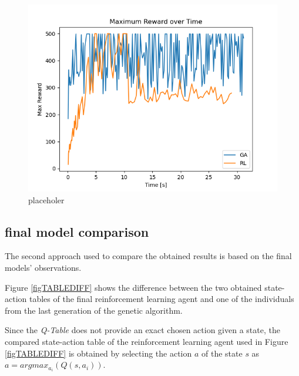 \begin{figure}[H]
	\centering
	\includegraphics [scale = 0.5]{Images/RL_GA_comparison_max.png}
	\caption{placeholer}
	\label{figMAX}
\end{figure}



\subsection{final model comparison}

The second approach used to compare the obtained results is based on the final models' observations.

Figure \ref{figTABLEDIFF} shows the difference between the two obtained state-action tables of the final reinforcement learning agent and one of the individuals from the last generation of the genetic algorithm.

Since the \textit{Q-Table} does not provide an exact chosen action given a state, the compared state-action table of the reinforcement learning agent used in Figure \ref{figTABLEDIFF} is obtained by selecting the action $a$ of the state $s$ as $a = argmax_{a_i} (Q(s,a_i))$.

